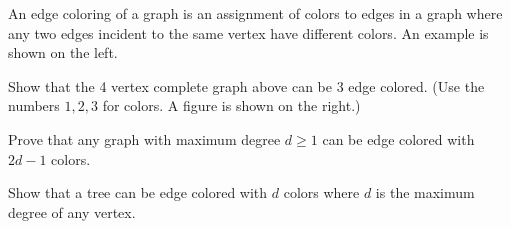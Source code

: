 \documentclass[11pt]{article}
\begin{document}

An edge coloring of a graph is an assignment of colors to edges in a graph where any two edges incident to the same vertex have different colors. An example is shown on the left.

\begin{center}
\end{center}

\begin{Parts}
\Part Show that the 4 vertex complete graph above can be 3 edge colored. (Use the numbers $1,2,3$ for colors. A figure is shown on the right.)

\Part Prove that any graph with maximum degree $d \geq 1$ can be edge colored with $2d-1$ colors. 

\Part Show that a tree can be edge colored with $d$ colors where $d$ is the maximum degree of any vertex.

\end{Parts}
\end{document}
